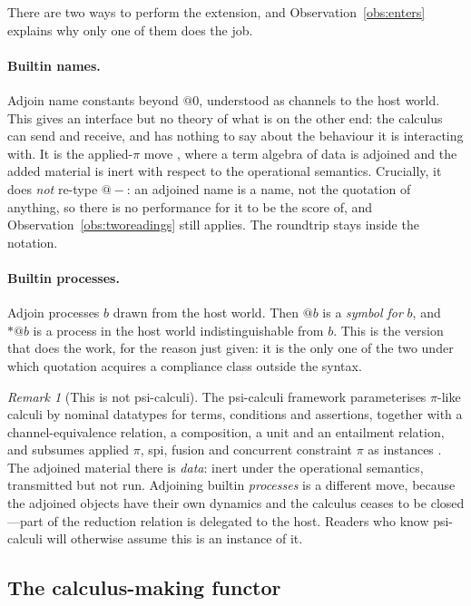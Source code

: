 \documentclass[11pt,a4paper]{article}
\makeatletter
\theoremstyle{definition}
\theoremstyle{plain}
\theoremstyle{remark}
\newtheorem{remark}[definition]{Remark}
\newcommand{\quo}[1]{@#1}
\makeatother
\begin{document}
There are two ways to perform the extension, and Observation~\ref{obs:enters} explains why
only one of them does the job.

\paragraph{Builtin names.} Adjoin name constants beyond $\quo{0}$, understood as channels
to the host world. This gives an interface but no theory of what is on the other end: the
calculus can send and receive, and has nothing to say about the behaviour it is
interacting with. It is the applied-$\pi$ move \cite{abadi2001}, where a term algebra of
data is adjoined and the added material is inert with respect to the operational
semantics. Crucially, it does \emph{not} re-type $\quo{-}$: an adjoined name is a name, not
the quotation of anything, so there is no performance for it to be the score of, and
Observation~\ref{obs:tworeadings} still applies. The roundtrip stays inside the notation.

\paragraph{Builtin processes.} Adjoin processes $b$ drawn from the host world. Then
$\quo{b}$ is a \emph{symbol for} $b$, and $*\quo{b}$ is a process in the host world
indistinguishable from $b$. This is the version that does the work, for the reason just
given: it is the only one of the two under which quotation acquires a compliance class
outside the syntax.

\begin{remark}[This is not psi-calculi]
The psi-calculi framework parameterises $\pi$-like calculi by nominal datatypes for terms,
conditions and assertions, together with a channel-equivalence relation, a composition, a
unit and an entailment relation, and subsumes applied $\pi$, spi, fusion and concurrent
constraint $\pi$ as instances \cite{bengtson2011}. The adjoined material there is
\emph{data}: inert under the operational semantics, transmitted but not run. Adjoining
builtin \emph{processes} is a different move, because the adjoined objects have their own
dynamics and the calculus ceases to be closed---part of the reduction relation is
delegated to the host. Readers who know psi-calculi will otherwise assume this is an
instance of it.
\end{remark}

\subsection{The calculus-making functor}
\end{document}
